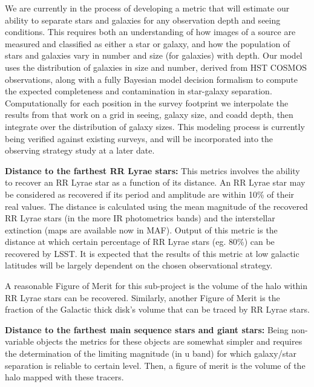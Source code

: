 We are currently in the process of developing a metric that will estimate our
ability to separate stars and galaxies for any observation depth and seeing
conditions. This requires both an understanding of how images of a source are
measured and classified as either a star or galaxy, and how the population of
stars and galaxies vary in number and size (for galaxies) with depth. Our model
uses the distribution of galaxies in size and number, derived from HST COSMOS
observations, along with a fully Bayesian model decision formalism to compute
the expected completeness and contamination in star-galaxy separation.
Computationally for each position in the survey footprint we interpolate the
results from that work on a grid in seeing, galaxy size, and coadd depth, then
integrate over the distribution of galaxy sizes. This modeling process is
currently being verified against existing surveys, and will be incorporated into
the observing strategy study at a later date.

\textbf{Distance to the farthest RR Lyrae stars:} This metrics involves the ability to
recover an RR Lyrae star as a function of its distance. An RR Lyrae star may be
considered as recovered if its period and amplitude are within 10\% of their real values.
The distance is calculated using the mean magnitude of the recovered RR Lyrae stars 
(in the more IR photometrics bands) and the interstellar extinction (maps are available 
now in MAF).  Output of this metric is the distance at which certain percentage of RR 
Lyrae stars (eg. 80\%) can be recovered by LSST. It is expected that the results 
of this metric at low galactic latitudes will be largely dependent on the chosen observational 
strategy. 

A reasonable Figure of Merit for this sub-project is the volume of the halo within RR Lyrae stars 
can be recovered. Similarly, another Figure of Merit is the fraction of the Galactic thick disk's volume that can be 
traced by RR Lyrae stars.

\textbf{Distance to the farthest main sequence stars and giant stars:} Being non-variable objects
the metrics for these objects are somewhat simpler and requires the determination of the limiting
magnitude (in u band) for which galaxy/star separation is reliable to certain level. Then, a figure of
merit is the volume of the halo mapped with these tracers. 





